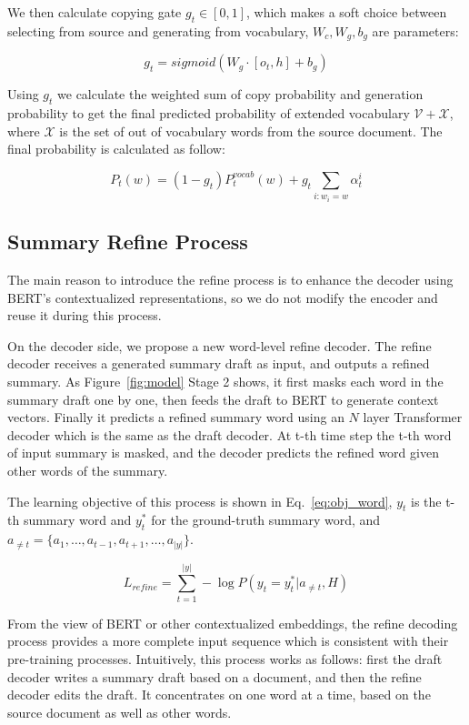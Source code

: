 \documentclass{article}
\begin{document}
We then calculate copying gate $g_t\in [0, 1]$, which makes a soft choice between selecting from source and generating from vocabulary, $W_c, W_g, b_g$ are parameters: 

\begin{equation}
g_t = sigmoid(W_g \cdot [o_t, h] + b_g) \label{eq:copy_prob}
\end{equation}

Using $g_t$ we calculate the weighted sum of copy probability and generation probability to get the final predicted probability of extended vocabulary $\mathcal{V} + \mathcal{X}$, where $\mathcal{X}$ is the set of out of vocabulary words from the source document. The final probability is calculated as follow:

\begin{equation}
P_t(w) = (1-g_t)P_t^{vocab}(w) + g_t\sum_{i:w_i=w} \alpha_t^i
\end{equation}

\subsection{Summary Refine Process}

The main reason to introduce the refine process is to enhance the decoder using BERT's contextualized representations, so we do not modify the encoder and reuse it during this process.

On the decoder side, we propose a new word-level refine decoder. The refine decoder receives a generated summary draft as input, and outputs a refined summary. As Figure~\ref{fig:model} Stage 2 shows, it first masks each word in the summary draft one by one, then feeds the draft to BERT to generate context vectors. Finally it predicts a refined summary word using an $N$ layer Transformer decoder which is the same as the draft decoder. At t-th time step the t-th word of input summary is masked, and the decoder predicts the refined word given other words of the summary.

The learning objective of this process is shown in Eq.~\eqref{eq:obj_word}, $y_t$ is the t-th summary word and $y_{t}^*$ for the ground-truth summary word, and $a_{\neq t} = \{a_1, \ldots, a_{t-1}, a_{t+1}, \ldots, a_{|y|}\}$.

\begin{equation}
    L_{refine} = \sum_{t=1}^{|y|} -\log P(y_t = y_t^*|a_{\neq t}, H) \label{eq:obj_word}
\end{equation}

From the view of BERT or other contextualized embeddings, the refine decoding process provides a more complete input sequence which is consistent with their pre-training processes. Intuitively, this process works as follows: first the draft decoder writes a summary draft based on a document, and then the refine decoder edits the draft. It concentrates on one word at a time, based on the source document as well as other words.
\end{document}
